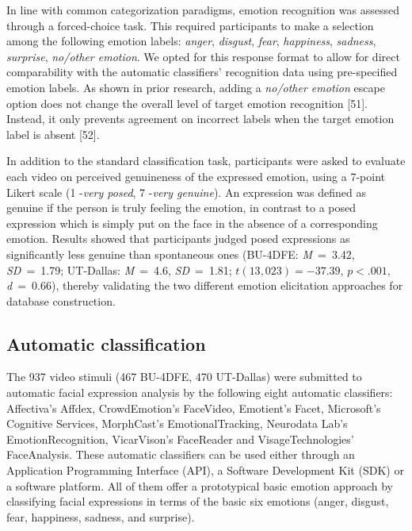 \documentclass[10pt,letterpaper]{article}
\begin{document}
In line with common categorization paradigms, emotion recognition was assessed through a forced-choice task. This required participants to make a selection among the following emotion labels: \emph{anger}, \emph{disgust}, \emph{fear}, \emph{happiness}, \emph{sadness}, \emph{surprise}, \emph{no/other emotion}. We opted for this response format to allow for direct comparability with the automatic classifiers' recognition data using pre-specified emotion labels. As shown in prior research, adding a \emph{no/other emotion} escape option does not change the overall level of target emotion recognition {[}51{]}. Instead, it only prevents agreement on incorrect labels when the target emotion label is absent {[}52{]}.

In addition to the standard classification task, participants were asked to evaluate each video on perceived genuineness of the expressed emotion, using a 7-point Likert scale (1 -\emph{very posed}, 7 -\emph{very genuine}). An expression was defined as genuine if the person is truly feeling the emotion, in contrast to a posed expression which is simply put on the face in the absence of a corresponding emotion. Results showed that participants judged posed expressions as significantly less genuine than spontaneous ones (BU-4DFE: \mbox{\textit{M} = 3.42}, \mbox{\textit{SD} = 1.79}; UT-Dallas: \mbox{\textit{M} = 4.6}, \mbox{\textit{SD} = 1.81}; \(t(13,023) = -37.39\), \(p < .001\), \mbox{\textit{d} = 0.66}), thereby validating the two different emotion elicitation approaches for database construction.

\hypertarget{automatic-classification}{%
\subsection*{Automatic classification}\label{automatic-classification}}

The 937 video stimuli (467 BU-4DFE, 470 UT-Dallas) were submitted to automatic facial expression analysis by the following eight automatic classifiers: Affectiva's Affdex, CrowdEmotion's FaceVideo, Emotient's Facet, Microsoft's Cognitive Services, MorphCast's EmotionalTracking, Neurodata Lab's EmotionRecognition, VicarVison's FaceReader and VisageTechnologies' FaceAnalysis. These automatic classifiers can be used either through an Application Programming Interface (API), a Software Development Kit (SDK) or a software platform. All of them offer a prototypical basic emotion approach by classifying facial expressions in terms of the basic six emotions (anger, disgust, fear, happiness, sadness, and surprise).
\end{document}
